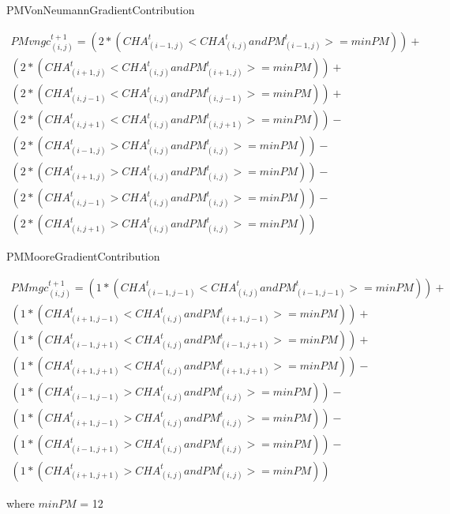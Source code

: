 PMVonNeumannGradientContribution

\begin{equation}
\begin{split}
PMvngc^{t+1}_{(i, j)} = 
(2* (CHA^t_{(i-1, j)} < CHA^t_{(i, j)} and PM^t_{(i-1, j)} >= minPM)) +
\\(2* (CHA^t_{(i+1, j)} < CHA^t_{(i, j)} and PM^t_{(i+1, j)} >= minPM)) + 
\\(2* (CHA^t_{(i, j-1)} < CHA^t_{(i, j)} and PM^t_{(i, j-1)} >= minPM)) +
\\(2* (CHA^t_{(i, j+1)} < CHA^t_{(i, j)} and PM^t_{(i, j+1)} >= minPM)) -
\\(2*(CHA^t_{(i-1, j)} > CHA^t_{(i, j)} and PM^t_{(i, j)} >= minPM)) -
\\(2*(CHA^t_{(i+1, j)} > CHA^t_{(i, j)} and PM^t_{(i, j)} >= minPM)) -
\\(2*(CHA^t_{(i, j-1)} > CHA^t_{(i, j)} and PM^t_{(i, j)} >= minPM)) -
\\(2*(CHA^t_{(i, j+1)} > CHA^t_{(i, j)} and PM^t_{(i, j)} >= minPM))
\end{split}
\end{equation}

PMMooreGradientContribution

\begin{equation}
\begin{split}
PMmgc^{t+1}_{(i, j)}= 
(1* (CHA^t_{(i-1, j-1)} < CHA^t_{(i, j)} and PM^t_{(i-1, j-1)}>= minPM)) +
\\(1* (CHA^t_{(i+1, j-1)} < CHA^t_{(i, j)} and PM^t_{(i+1, j-1)} >= minPM)) + 
\\(1* (CHA^t_{(i-1, j+1)} < CHA^t_{(i, j)} and PM^t_{(i-1, j+1)} >= minPM)) +
\\(1* (CHA^t_{(i+1, j+1)}  < CHA^t_{(i, j)} and PM^t_{(i+1, j+1)} >= minPM)) - 
\\(1*(CHA^t_{(i-1, j-1)} > CHA^t_{(i, j)} and PM^t_{(i, j)} >= minPM)) -
\\(1*(CHA^t_{(i+1, j-1)} > CHA^t_{(i, j)} and PM^t_{(i, j)} >= minPM)) -
\\(1*(CHA^t_{(i-1, j+1)} > CHA^t_{(i, j)} and PM^t_{(i, j)} >= minPM)) -
\\(1*(CHA^t_{(i+1, j+1)} > CHA^t_{(i, j)} and PM^t_{(i, j)} >= minPM))
\end{split}
\end{equation}

where $minPM$ = 12
